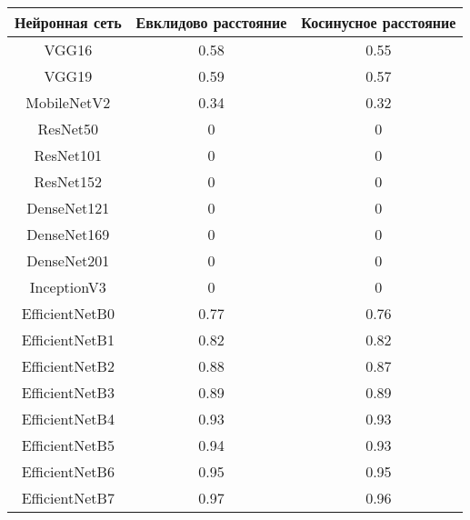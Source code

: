 \documentclass{article}
\begin{document}
\begin{center}
\begin{tabular}{ |c|c|c| } 
 \hline
 Нейронная сеть & Евклидово расстояние & Косинусное расстояние \\ 
 \hline
 \hline
 VGG16 & 0.58 & 0.55 \\
 \hline
 VGG19 & 0.59 & 0.57 \\
 \hline
 MobileNetV2 & 0.34 & 0.32 \\
 \hline
 ResNet50 & 0 & 0 \\
 \hline
 ResNet101 & 0 & 0 \\
 \hline
 ResNet152 & 0 & 0 \\
 \hline
 DenseNet121 & 0 & 0 \\
 \hline
 DenseNet169 & 0 & 0 \\
 \hline
 DenseNet201 & 0 & 0 \\
 \hline
 InceptionV3 & 0 & 0 \\
 \hline
 EfficientNetB0 & 0.77 & 0.76 \\
 \hline
 EfficientNetB1 & 0.82 & 0.82 \\
 \hline
 EfficientNetB2 & 0.88 & 0.87 \\
 \hline
 EfficientNetB3 & 0.89 & 0.89 \\
 \hline
 EfficientNetB4 & 0.93 & 0.93 \\
 \hline
 EfficientNetB5 & 0.94 & 0.93 \\
 \hline
 EfficientNetB6 & 0.95 & 0.95 \\
 \hline
 EfficientNetB7 & 0.97 & 0.96 \\
 \hline
\end{tabular}
\end{center}
\end{document}
